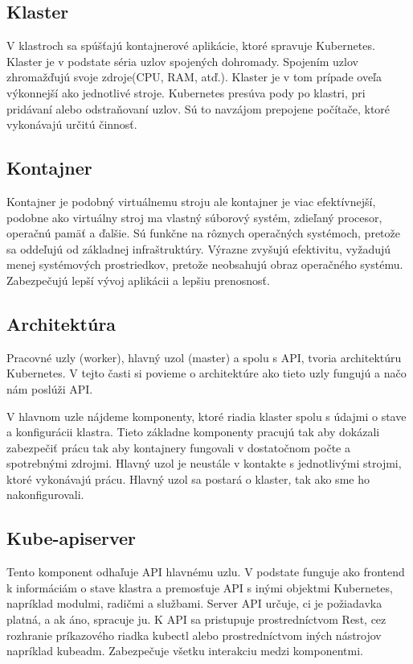 \subsection*{Klaster}
V klastroch sa spúšťajú kontajnerové aplikácie, ktoré spravuje Kubernetes. Klaster je v podstate séria uzlov spojených dohromady. Spojením uzlov zhromažďujú svoje zdroje(CPU, RAM, atď.). Klaster je v tom prípade oveľa výkonnejší ako jednotlivé stroje. Kubernetes presúva pody po klastri, pri pridávaní alebo odstraňovaní uzlov.\cite{kubernetes2} Sú to navzájom prepojene počítače, ktoré vykonávajú určitú činnosť.

\subsection*{Kontajner}
Kontajner je podobný virtuálnemu stroju ale kontajner je viac efektívnejší, podobne ako virtuálny stroj ma vlastný súborový systém, zdieľaný procesor, operačnú pamäť a ďalšie. Sú funkčne na rôznych operačných systémoch, pretože sa oddeľujú od základnej infraštruktúry.\cite{kubernetes}
Výrazne zvyšujú efektivitu, vyžadujú menej systémových prostriedkov, pretože neobsahujú obraz operačného systému. Zabezpečujú lepší vývoj aplikácii a lepšiu prenosnosť.

\subsection{Architektúra}
Pracovné uzly (worker), hlavný uzol (master) a spolu s API, tvoria architektúru Kubernetes. V tejto časti si povieme o architektúre ako tieto uzly fungujú a načo nám poslúži API.

V hlavnom uzle nájdeme komponenty, ktoré riadia klaster spolu s údajmi o stave a konfigurácii klastra. Tieto základne komponenty pracujú tak aby dokázali zabezpečiť prácu tak aby kontajnery fungovali v dostatočnom počte a spotrebnými zdrojmi.
Hlavný uzol je neustále v kontakte s jednotlivými strojmi, ktoré vykonávajú prácu. Hlavný uzol sa postará o klaster, tak ako sme ho nakonfigurovali.

\subsection*{Kube-apiserver}
Tento komponent odhaľuje API hlavnému uzlu. V podstate funguje ako frontend k informáciám o stave klastra a premosťuje API s inými objektmi Kubernetes, napríklad modulmi, radičmi a službami. Server API určuje, ci je požiadavka platná, a ak áno, spracuje ju. K API sa pristupuje prostredníctvom Rest, cez rozhranie príkazového riadka kubectl alebo prostredníctvom iných nástrojov napríklad kubeadm. Zabezpečuje všetku interakciu medzi komponentmi.

